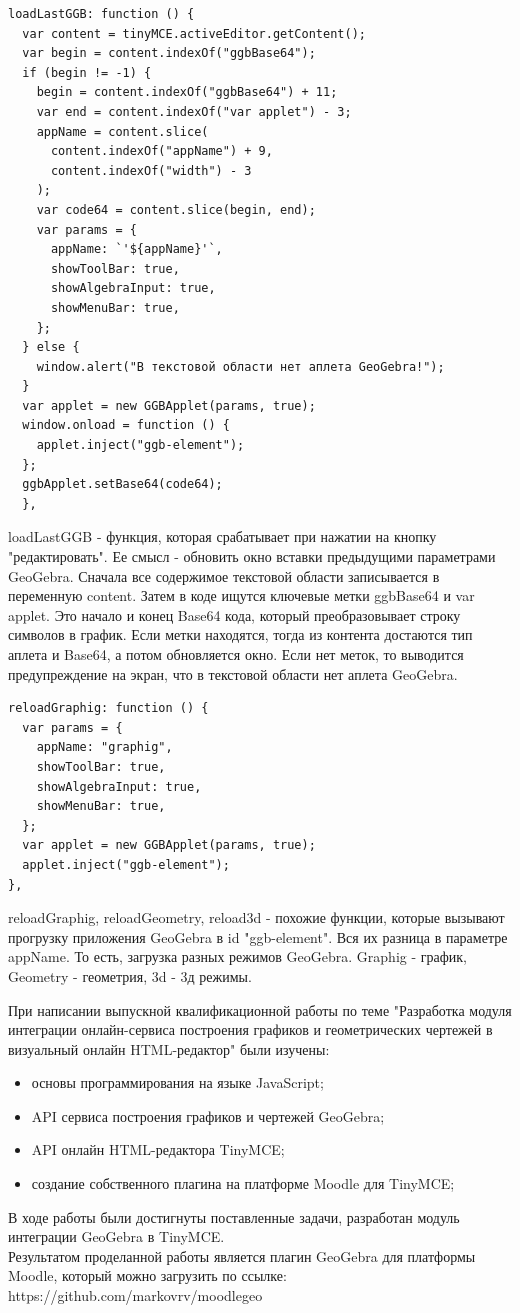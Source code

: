 \documentclass[14pt,Diplom]{diplomwork}
\begin{document}
\begin{verbatim}
loadLastGGB: function () {
  var content = tinyMCE.activeEditor.getContent();
  var begin = content.indexOf("ggbBase64");
  if (begin != -1) {
    begin = content.indexOf("ggbBase64") + 11;
    var end = content.indexOf("var applet") - 3;
    appName = content.slice(
      content.indexOf("appName") + 9,
      content.indexOf("width") - 3
    );
    var code64 = content.slice(begin, end);
    var params = {
      appName: `'${appName}'`,
      showToolBar: true,
      showAlgebraInput: true,
      showMenuBar: true,
    };
  } else {
    window.alert("В текстовой области нет аплета GeoGebra!");
  }
  var applet = new GGBApplet(params, true);
  window.onload = function () {
    applet.inject("ggb-element");
  };
  ggbApplet.setBase64(code64);
  },
\end{verbatim}
loadLastGGB - функция, которая срабатывает при нажатии на кнопку "редактировать". Ее смысл - обновить окно вставки предыдущими параметрами GeoGebra. Сначала все содержимое текстовой области записывается в переменную content. Затем в коде ищутся ключевые метки ggbBase64 и var applet. Это начало и конец Base64 кода, который преобразовывает строку символов в график. Если метки находятся, тогда из контента достаются тип аплета и Base64, а потом обновляется окно. Если нет меток, то выводится предупреждение на экран, что в текстовой области нет аплета GeoGebra.

\begin{verbatim}
reloadGraphig: function () {
  var params = {
    appName: "graphig",
    showToolBar: true,
    showAlgebraInput: true,
    showMenuBar: true,
  };
  var applet = new GGBApplet(params, true);
  applet.inject("ggb-element");
},
\end{verbatim}

reloadGraphig, reloadGeometry, reload3d - похожие функции, которые вызывают прогрузку приложения GeoGebra в id "ggb-element". Вся их разница в параметре appName. То есть, загрузка разных режимов GeoGebra. Graphig - график, Geometry - геометрия, 3d - 3д режимы.


При написании выпускной квалификационной работы по теме "Разработка модуля интеграции онлайн-сервиса построения графиков и геометрических чертежей в визуальный онлайн HTML-редактор" были изучены:
\begin{itemize}
	\item основы программирования на языке JavaScript;
	\item API сервиса построения графиков и чертежей GeoGebra;
	\item API онлайн HTML-редактора TinyMCE;
	\item создание собственного плагина на платформе Moodle для TinyMCE;
\end{itemize}
В ходе работы были достигнуты поставленные задачи, разработан модуль интеграции GeoGebra в TinyMCE.\\
Результатом проделанной работы является плагин GeoGebra для платформы Moodle, который можно загрузить по ссылке: https://github.com/markovrv/moodlegeo
\end{document}
